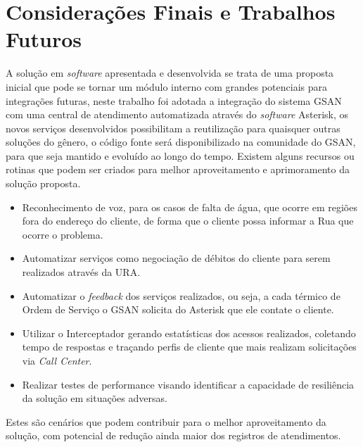 \chapter[Considerações Finais e Trabalhos Futuros]{\textbf{C}onsiderações Finais e \textbf{T}rabalhos Futuros}

A solução em \textit{software} apresentada e desenvolvida se trata de uma proposta inicial que pode se tornar um módulo interno com grandes potenciais para integrações futuras, neste trabalho foi adotada a integração do sistema GSAN com uma central de atendimento automatizada através do \textit{software} Asterisk, os novos serviços desenvolvidos possibilitam a reutilização para quaisquer outras soluções do gênero, o código fonte será disponibilizado na comunidade do GSAN, para que seja mantido e evoluído ao longo do tempo. Existem alguns recursos ou rotinas que podem ser criados para melhor aproveitamento e aprimoramento da solução proposta.

\begin{itemize}
	\item Reconhecimento de voz, para os casos de falta de água, que ocorre em regiões fora do endereço do cliente, de forma que o cliente possa informar a Rua que ocorre o problema.
	\item Automatizar serviços como negociação de débitos do cliente para serem realizados através da URA.
	\item Automatizar o \textit{feedback} dos serviços realizados, ou seja, a cada térmico de Ordem de Serviço o GSAN solicita do Asterisk que ele contate o cliente.
	\item Utilizar o Interceptador gerando estatísticas dos acessos realizados, coletando tempo de respostas e traçando perfis de cliente que mais realizam solicitações via \textit{Call Center}.
	\item Realizar testes de performance visando identificar a capacidade de resiliência da solução em situações adversas. 
\end{itemize}


Estes são cenários que podem contribuir para o melhor aproveitamento da solução, com potencial de redução ainda maior dos registros de atendimentos. 
